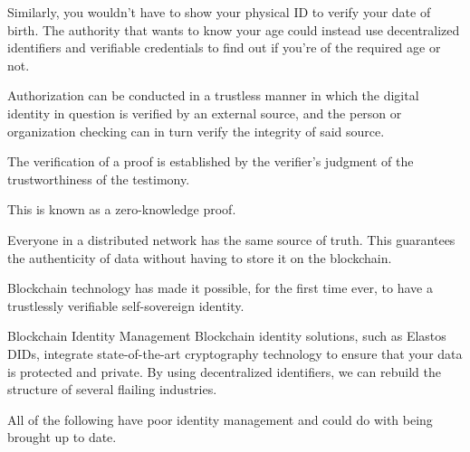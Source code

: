 Similarly, you wouldn't have to show your physical ID to verify your date of birth. The authority that wants to know your age could instead use decentralized identifiers and verifiable credentials to find out if you're of the required age or not.

Authorization can be conducted in a trustless manner in which the digital identity in question is verified by an external source, and the person or organization checking can in turn verify the integrity of said source. 

The verification of a proof is established by the verifier's judgment of the trustworthiness of the testimony.

This is known as a zero-knowledge proof.

Everyone in a distributed network has the same source of truth. This guarantees the authenticity of data without having to store it on the blockchain.

Blockchain technology has made it possible, for the first time ever, to have a trustlessly verifiable self-sovereign identity.

Blockchain Identity Management
Blockchain identity solutions, such as Elastos DIDs, integrate state-of-the-art cryptography technology to ensure that your data is protected and private. By using decentralized identifiers, we can rebuild the structure of several flailing industries. 

All of the following have poor identity management and could do with being brought up to date.





